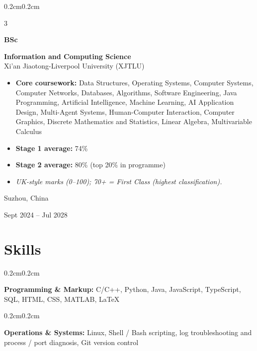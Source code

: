 \documentclass[10pt, a4paper]{article}
\newenvironment{highlights}{
    \begin{itemize}[
        topsep=0.10cm, parsep=0.10cm,
        partopsep=0pt, itemsep=0pt,
        leftmargin=0.4cm + 10pt
    ]
}{
    \end{itemize}
}
\newenvironment{onecolentry}{
    \begin{adjustwidth}{0.2cm}{0.2cm}
}{
    \end{adjustwidth}
}
\newenvironment{threecolentry}[3][]{
    \onecolentry
    \def\thirdColumn{#3}
    \setcolumnwidth{1cm, \fill, 4.5cm}
    \begin{paracol}{3}
    {\raggedright #2} \switchcolumn
}{
    \switchcolumn \raggedleft \thirdColumn
    \end{paracol}
    \endonecolentry
}
\newcommand{\cvtitle}[1]{%
    {\fontsize{10.5pt}{12pt}\selectfont #1\par}%
    \vspace{0.02cm}%
}
\begin{document}
    \begin{threecolentry}{\textbf{BSc}}{
        Suzhou, China

        Sept 2024 – Jul 2028
    }
        \cvtitle{\textbf{Information and Computing Science} \\ Xi'an Jiaotong-Liverpool University (XJTLU)}
        \begin{highlights}
            \item \textbf{Core coursework:} Data Structures, Operating Systems, Computer Systems, Computer Networks, Databases, Algorithms, Software Engineering, Java Programming, Artificial Intelligence, Machine Learning, AI Application Design, Multi-Agent Systems, Human-Computer Interaction, Computer Graphics, Discrete Mathematics and Statistics, Linear Algebra, Multivariable Calculus
            \item \textbf{Stage 1 average:} 74\%
            \item \textbf{Stage 2 average:} 80\% (top 20\% in programme)
            \item[] {\small\color{grayText}\textit{UK-style marks (0--100); 70+ = First Class (highest classification).}}
        \end{highlights}
    \end{threecolentry}

\vspace{-0.2cm}
\section{Skills}

    \begin{onecolentry}
        \textbf{Programming \& Markup:} C/C++, Python, Java, JavaScript, TypeScript, SQL, HTML, CSS, MATLAB, LaTeX
    \end{onecolentry}

\vspace{0.06cm}

    \begin{onecolentry}
        \textbf{Operations \& Systems:} Linux, Shell / Bash scripting, log troubleshooting and process / port diagnosis, Git version control
    \end{onecolentry}
\end{document}
